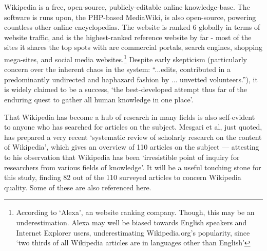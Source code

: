 


Wikipedia is a free, open-source, publicly-editable online
knowledge-base. The software is runs upon, the PHP-based MediaWiki, is
also open-source, powering countless other online encyclopedias. The
website is ranked 6 globally in terms of website traffic,
and is the highest-ranked reference website by far - most of the sites
it shares the top spots with are commercial portals, search engines,
shopping mega-sites, and social media websites.\footnote{According to
  `Alexa', an website ranking company.\cite{Alexa-about2014} Though,
  this may be an underestimation. Alexa may well be biased towards
  English speakers and Internet Explorer users, underestimating
  Wikipedia.org's popularity, since `two thirds of all Wikipedia
  articles are in languages other than
  English'\cite{wikimedia-noteonalexa}}\label{sec:popularity} Despite
early skepticism (particularly concern over the inherent chaos in the
system: ``...edits, contributed in a predominantly undirected and
haphazard fashion by ... unvetted volunteers.''\cite{Wilkinson2007}),
it is widely claimed to be a success, `the best-developed attempt thus
far of the enduring quest to gather all human knowledge in one
place'\cite{Mesgari2014}.

That Wikipedia has become a hub of research in many fields is also
self-evident to anyone who has searched for articles on the
subject. Mesgari et al, just quoted, has prepared a very recent
`systematic review of scholarly research on the content of Wikipedia',
which gives an overview of 110 articles on the subject --- attesting
to his observation that Wikipedia has been `irresistible point of
inquiry for researchers from various fields of knowledge'. It will be
a useful touching stone for this study, finding 82 out of the 110
surveyed articles to concern Wikipedia quality. Some of these are also
referenced here.

